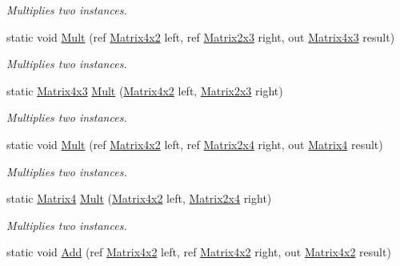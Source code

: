 \begin{DoxyCompactItemize}
\begin{DoxyCompactList}\small\item\em Multiplies two instances. \end{DoxyCompactList}\item 
static void \hyperlink{struct_open_t_k_1_1_matrix4x2_ac9225844a84ea6e72abb20f35ee0f698}{Mult} (ref \hyperlink{struct_open_t_k_1_1_matrix4x2}{Matrix4x2} left, ref \hyperlink{struct_open_t_k_1_1_matrix2x3}{Matrix2x3} right, out \hyperlink{struct_open_t_k_1_1_matrix4x3}{Matrix4x3} result)
\begin{DoxyCompactList}\small\item\em Multiplies two instances. \end{DoxyCompactList}\item 
static \hyperlink{struct_open_t_k_1_1_matrix4x3}{Matrix4x3} \hyperlink{struct_open_t_k_1_1_matrix4x2_abbea99131aa3958c7024415e85a3820c}{Mult} (\hyperlink{struct_open_t_k_1_1_matrix4x2}{Matrix4x2} left, \hyperlink{struct_open_t_k_1_1_matrix2x3}{Matrix2x3} right)
\begin{DoxyCompactList}\small\item\em Multiplies two instances. \end{DoxyCompactList}\item 
static void \hyperlink{struct_open_t_k_1_1_matrix4x2_aa980886917f3d7dc180347846d555696}{Mult} (ref \hyperlink{struct_open_t_k_1_1_matrix4x2}{Matrix4x2} left, ref \hyperlink{struct_open_t_k_1_1_matrix2x4}{Matrix2x4} right, out \hyperlink{struct_open_t_k_1_1_matrix4}{Matrix4} result)
\begin{DoxyCompactList}\small\item\em Multiplies two instances. \end{DoxyCompactList}\item 
static \hyperlink{struct_open_t_k_1_1_matrix4}{Matrix4} \hyperlink{struct_open_t_k_1_1_matrix4x2_aa1ded94245aa18a4dd1726ba372b1350}{Mult} (\hyperlink{struct_open_t_k_1_1_matrix4x2}{Matrix4x2} left, \hyperlink{struct_open_t_k_1_1_matrix2x4}{Matrix2x4} right)
\begin{DoxyCompactList}\small\item\em Multiplies two instances. \end{DoxyCompactList}\item 
static void \hyperlink{struct_open_t_k_1_1_matrix4x2_a715e47ebed0e3ae9e6c047c36c4bc77a}{Add} (ref \hyperlink{struct_open_t_k_1_1_matrix4x2}{Matrix4x2} left, ref \hyperlink{struct_open_t_k_1_1_matrix4x2}{Matrix4x2} right, out \hyperlink{struct_open_t_k_1_1_matrix4x2}{Matrix4x2} result)

\end{DoxyCompactItemize}
